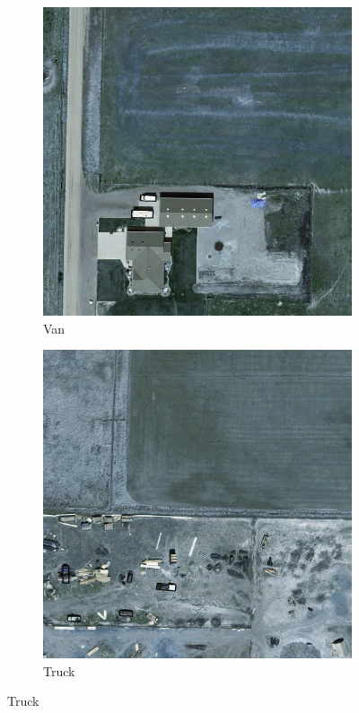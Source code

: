 \begin{figure}[h!]
    \centering
    \begin{subfigure}[t]{0.38\textwidth}
        \centering
        \includegraphics[width=\linewidth]{images/015Results/02perm_exp/comp_images/ground_truth/198.png}
        \caption{Van}
    \end{subfigure}
    \begin{subfigure}[t]{0.38\textwidth}
        \centering
        \includegraphics[width=\linewidth]{images/015Results/02perm_exp/comp_images/ground_truth/212.png}
        \caption{Truck}
    \end{subfigure}
    

\end{figure}
